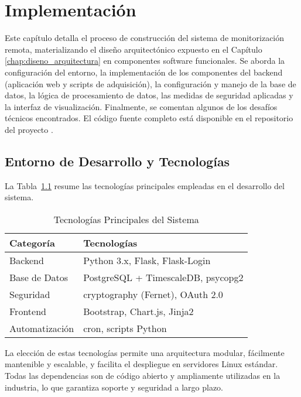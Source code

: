 \chapter{Implementación}
\label{chap:implementacion}

Este capítulo detalla el proceso de construcción del sistema de monitorización remota, materializando el diseño arquitectónico expuesto en el Capítulo \ref{chap:diseno_arquitectura} en componentes software funcionales. Se aborda la configuración del entorno, la implementación de los componentes del backend (aplicación web y scripts de adquisición), la configuración y manejo de la base de datos, la lógica de procesamiento de datos, las medidas de seguridad aplicadas y la interfaz de visualización. Finalmente, se comentan algunos de los desafíos técnicos encontrados. El código fuente completo está disponible en el repositorio del proyecto \citep{github_repo_proyecto}.

\section{Entorno de Desarrollo y Tecnologías}
\label{sec:impl_entorno}

La Tabla~\ref{tab:tecnologias} resume las tecnologías principales empleadas en el desarrollo del sistema.

\begin{table}[htbp]
\caption{Tecnologías Principales del Sistema}
\label{tab:tecnologias}
\begin{tabular}{|p{}|p{}|}
\hline
\textbf{Categoría} & \textbf{Tecnologías} \\
\hline
Backend & Python 3.x, Flask, Flask-Login \\
\hline
Base de Datos & PostgreSQL + TimescaleDB, psycopg2 \\
\hline
Seguridad & cryptography (Fernet), OAuth 2.0 \\
\hline
Frontend & Bootstrap, Chart.js, Jinja2 \\
\hline
Automatización & cron, scripts Python \\
\hline
\end{tabular}
\end{table}

La elección de estas tecnologías permite una arquitectura modular, fácilmente mantenible y escalable, y facilita el despliegue en servidores Linux estándar. Todas las dependencias son de código abierto y ampliamente utilizadas en la industria, lo que garantiza soporte y seguridad a largo plazo.

